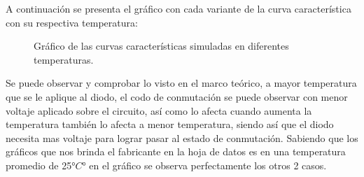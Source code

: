 \documentclass[chaptersright]{informeutn}
\begin{document}
      A continuación se presenta el gráfico con cada variante de la curva característica con su respectiva temperatura:
      \begin{figure}[H]
        \centering
        \caption{Gráfico de las curvas características simuladas en diferentes temperaturas.}
        \label{graph.simulation.temperatura}
      \end{figure}

      Se puede observar y comprobar lo visto en el marco teórico, a mayor temperatura que se le aplique al diodo,
      el codo de conmutación se puede observar con menor voltaje aplicado sobre el circuito, así como lo afecta
      cuando aumenta la temperatura también lo afecta a menor temperatura, siendo así que el diodo necesita mas
      voltaje para lograr pasar al estado de conmutación. Sabiendo que los gráficos que nos brinda el
      fabricante en la hoja de datos es en una temperatura promedio de 25$°C°$ en el gráfico se observa
      perfectamente  los otros 2 casos.
\end{document}

